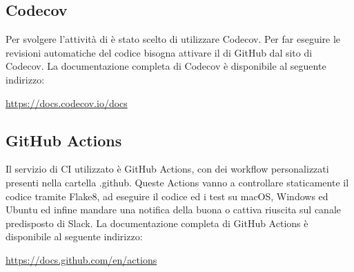 \subsection{Codecov}
Per svolgere l'attività di  è stato scelto di utilizzare Codecov.
Per far eseguire le revisioni automatiche del codice bisogna attivare il  di GitHub dal sito di Codecov.
La documentazione completa di Codecov è disponibile al seguente indirizzo:
\newline{}\centerline{\url{https://docs.codecov.io/docs}}

\subsection{GitHub Actions}
Il servizio di CI utilizzato è GitHub Actions, con dei workflow personalizzati presenti nella cartella .github.
Queste Actions vanno a controllare staticamente il codice tramite Flake8, ad eseguire il codice ed i test su macOS, Windows ed Ubuntu ed infine mandare una notifica della buona o cattiva riuscita sul canale predisposto di Slack.
La documentazione completa di GitHub Actions è disponibile al seguente indirizzo:
\newline{}\centerline{\url{https://docs.github.com/en/actions}}
